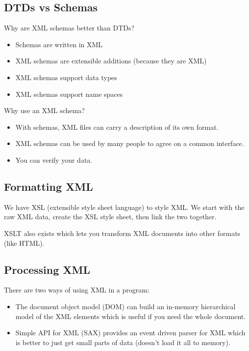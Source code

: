 \subsection{DTDs vs Schemas}\label{sub:dtds_vs_schemas}

Why are XML schemas better than DTDs?
\begin{itemize}
	\item Schemas are written in XML
	\item XML schemas are extensible additions (because they are XML)
	\item XML schemas support data types
	\item XML schemas support name spaces
\end{itemize}
Why use an XML schema?
\begin{itemize}
	\item With schemas, XML files can carry a description of its own format.
	\item XML schemas can be used by many people to agree on a common interface.
	\item You can verify your data.
\end{itemize}

\subsection{Formatting XML}\label{sub:formatting_xml}

We have XSL (extensible style sheet language) to style XML.
We start with the raw XML data, create the XSL style sheet, then link the two together.

\begin{note}
	XSLT also exists which lets you transform XML documents into other formats (like HTML).
\end{note}

\subsection{Processing XML}\label{sub:processing_xml}

There are two ways of using XML in a program:
\begin{itemize}
	\item The document object model (DOM) can build an in-memory hierarchical model of the XML elements which is useful if you need the whole document.
	\item Simple API for XML (SAX) provides an event driven parser for XML which is better to just get small parts of data (doesn't load it all to memory).
\end{itemize}


